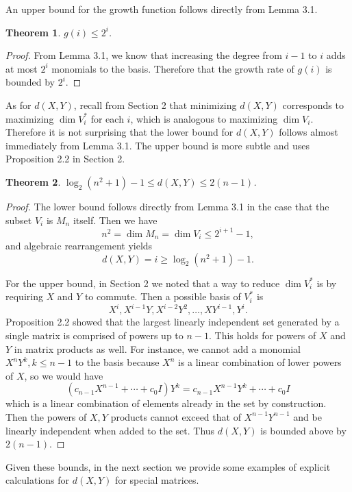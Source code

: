 \documentclass[11pt]{amsart}
\newtheorem{theorem}{Theorem}
\numberwithin{equation}{section}
\numberwithin{figure}{section}
\numberwithin{theorem}{section}
\begin{document}
An upper bound for the growth function follows directly from Lemma 3.1. 
\begin{theorem}
$g(i)\leq 2^i$.
\end{theorem}
\begin{proof}
From Lemma 3.1, we know that increasing the degree from $i-1$ to $i$ adds at most $2^i$ monomials to the basis. Therefore that the growth rate of $g(i)$ is bounded by $2^i$.
\end{proof}
As for $d(X,Y)$, recall from Section 2 that minimizing $d(X,Y)$ corresponds to maximizing $\dim V^*_i$ for each $i$, which is analogous to maximizing $\dim V_i$. Therefore it is not surprising that the lower bound for $d(X,Y)$ follows almost immediately from Lemma 3.1. The upper bound is more subtle and uses Proposition 2.2 in Section 2. 
\begin{theorem}
$\log_2(n^2+1)-1\leq d(X,Y)\leq 2(n-1)$. 
\end{theorem}
\begin{proof}
The lower bound follows directly from Lemma 3.1 in the case that the subset $V_i$ is $M_n$ itself. Then we have $$n^2=\dim M_n=\dim V_i\leq 2^{i+1}-1,$$ and algebraic rearrangement yields $$d(X,Y)=i\geq\log_2(n^2+1)-1.$$ 

For the upper bound, in Section 2 we noted that a way to reduce $\dim V^*_i$ is by requiring $X$ and $Y$ to commute. Then a possible basis of $V^*_i$ is $$X^i,X^{i-1}Y,X^{i-2}Y^2,\ldots,XY^{i-1},Y^i.$$ Proposition 2.2 showed that the largest linearly independent set generated by a single matrix is comprised of powers up to $n-1$. This holds for powers of $X$ and $Y$ in matrix products as well. For instance, we cannot add a monomial $X^nY^k,k\leq n-1$ to the basis because $X^n$ is a linear combination of lower powers of $X$, so we would have $$(c_{n-1}X^{n-1}+\cdots+c_0I)Y^k=c_{n-1}X^{n-1}Y^k+\cdots+c_0I$$ which is a linear combination of elements already in the set by construction. Then the powers of $X,Y$ products cannot exceed that of $X^{n-1}Y^{n-1}$ and be linearly independent when added to the set. Thus $d(X,Y)$ is bounded above by $2(n-1)$. 
\end{proof}

Given these bounds, in the next section we provide some examples of explicit calculations for $d(X,Y)$ for special matrices. 
\end{document}
